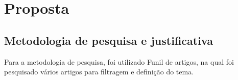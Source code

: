 \documentclass[
    12pt,                %
    openright,           %
    oneside,             %
    a4paper,             %
    english,             %
    brazil               %
]{abntex2}
\begin{document}

\frenchspacing

\pretextual

\imprimircapa

\imprimirfolhaderosto



\tableofcontents*
\cleardoublepage

\textual

\chapter{Proposta}
\label{cap:introducao}

\section{Metodologia de pesquisa e justificativa}
\label{sec:metodologia_de_pesquisa_e_justificativa}

Para a metodologia de pesquisa, foi utilizado Funil de artigos, na qual foi pesquisado vários artigos para filtragem e definição do tema.
\end{document}
